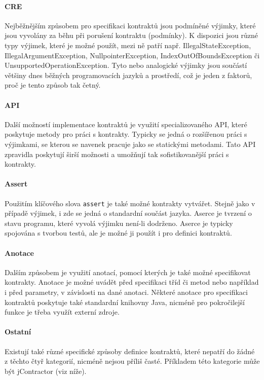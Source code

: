 		\paragraph{CRE}
		 Nejběžnějším způsobem pro specifikaci kontraktů jsou podmíněné výjimky, které jsou vyvolány za běhu při porušení kontraktu (podmínky). K dispozici jsou různé typy výjimek, které je možné použít, mezi ně patří např. IllegalStateException, IllegalArgumentException, NullpointerException, IndexOutOfBoundsException či UnsupportedOperationException. Tyto nebo analogické výjimky jsou součástí většiny dnes běžných programovacích jazyků a prostředí, což je jeden z faktorů, proč je tento způsob tak četný.
				
		\paragraph{API}
		Další možností implementace kontraktů je využití specializovaného API, které poskytuje metody pro práci s kontrakty. Typicky se jedná o rozšířenou práci s výjimkami, se kterou se navenek pracuje jako se statickými metodami. Tato API zpravidla poskytují širší možnosti a umožňují tak sofistikovanější práci s kontrakty.
		
		\paragraph{Assert}
		Použitím klíčového slova \texttt{assert} je také možné kontrakty vytvářet. Stejně jako v případě výjimek, i zde se jedná o standardní součást jazyka. Aserce je tvrzení o stavu programu, které vyvolá výjimku není-li dodrženo. Aserce je typicky spojována s tvorbou testů, ale je možné ji použít i pro definici kontraktů.
		
		\paragraph{Anotace}
		Dalším způsobem je využití anotací, pomocí kterých je také možné specifikovat kontrakty. Anotace je možné uvádět před specifikaci tříd či metod nebo například i před parametry, v závislosti na dané anotaci. Některé anotace pro specifikaci kontraktů poskytuje také standardní knihovny Java, nicméně pro pokročilejší funkce je třeba využít externí zdroje.
		
		\paragraph{Ostatní}
		Existují také různé specifické způsoby definice kontraktů, které nepatří do žádné z těchto čtyř kategorií, nicméně nejsou příliš časté. Příkladem této kategorie může být jContractor (viz níže).
	


